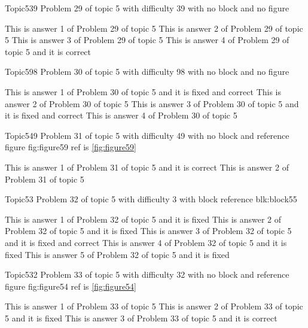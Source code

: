 \documentclass[master]{exam}
\begin{document}
\begin{problem}{Topic5}{39}
	Problem 29 of topic 5 with difficulty 39 with no block and no figure
	\begin{answers}
		\answer This is answer 1 of Problem 29 of topic 5 
		\answer This is answer 2 of Problem 29 of topic 5 
		\answer This is answer 3 of Problem 29 of topic 5 
		\answer[correct] This is answer 4 of Problem 29 of topic 5 and it is correct
	\end{answers}
\end{problem}

\begin{problem}{Topic5}{98}
	Problem 30 of topic 5 with difficulty 98 with no block and no figure
	\begin{answers}
		 This is answer 1 of Problem 30 of topic 5 and it is fixed and correct
		\answer This is answer 2 of Problem 30 of topic 5 
		 This is answer 3 of Problem 30 of topic 5 and it is fixed and correct
		\answer This is answer 4 of Problem 30 of topic 5 
	\end{answers}
\end{problem}

\begin{problem}{Topic5}{49}
	Problem 31 of topic 5 with difficulty 49 with no block and reference figure fig:figure59 ref is \ref{fig:figure59}
	\begin{answers}
		\answer[correct] This is answer 1 of Problem 31 of topic 5 and it is correct
		\answer This is answer 2 of Problem 31 of topic 5 
	\end{answers}
\end{problem}

\begin{problem}[requires=blk:block55]{Topic5}{3}
	Problem 32 of topic 5 with difficulty 3 with block reference blk:block55
	\begin{answers}
		\answer[fixed] This is answer 1 of Problem 32 of topic 5 and it is fixed
		\answer[fixed] This is answer 2 of Problem 32 of topic 5 and it is fixed
		 This is answer 3 of Problem 32 of topic 5 and it is fixed and correct
		\answer[fixed] This is answer 4 of Problem 32 of topic 5 and it is fixed
		\answer[fixed] This is answer 5 of Problem 32 of topic 5 and it is fixed
	\end{answers}
\end{problem}

\begin{problem}{Topic5}{32}
	Problem 33 of topic 5 with difficulty 32 with no block and reference figure fig:figure54 ref is \ref{fig:figure54}
	\begin{answers}
		\answer This is answer 1 of Problem 33 of topic 5 
		\answer[fixed] This is answer 2 of Problem 33 of topic 5 and it is fixed
		\answer[correct] This is answer 3 of Problem 33 of topic 5 and it is correct
	\end{answers}
\end{problem}
\end{document}
